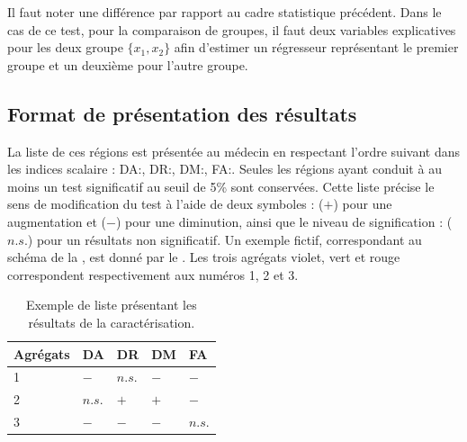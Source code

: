 Il faut noter une différence par rapport au cadre statistique précédent.
Dans le cas de ce test, pour la comparaison de groupes, il faut deux variables explicatives pour les deux groupe $\{x_1, x_2\}$ 
afin d'estimer un régresseur représentant le premier groupe et un deuxième pour l'autre groupe.


\subsection{Format de présentation des résultats}
La liste de ces régions est présentée au médecin en respectant l'ordre suivant dans les indices scalaire : DA:\da, DR:\dr, DM:\md, FA:\fa.
Seules les régions ayant conduit à au moins un test significatif au seuil de 5\% sont conservées. 
Cette liste précise le sens de modification du test à l'aide de deux symboles : ($+$) pour une augmentation et ($-$) pour une diminution, 
ainsi que le niveau de signification : ($n.s.$) pour un résultats non significatif.
Un exemple fictif, correspondant au schéma de la , est donné par le .
Les trois agrégats violet, vert et rouge correspondent respectivement aux numéros {\color{purple}1}, {\color{green}2} et {\color{red}3}.

\begin{table}[ht]
\centering
\begin{tabular}{|D{2cm}|D{1cm}|D{1cm}|D{1cm}|D{1cm}|}
      \hline
      \textbf{Agrégats} & \textbf{DA} & \textbf{DR} & \textbf{DM }& \textbf{FA} \tabularnewline
      \hline
      {\color{purple}1} & $-$ & $n.s.$ & $-$ & $-$\tabularnewline
      {\color{green}2} & $n.s.$ & $+$ & $+$ & $-$\tabularnewline
      {\color{red}3} & $-$ & $-$ & $-$ & $n.s.$\tabularnewline
      \hline
  \end{tabular}
  \caption{\label{ex_caracterisation}Exemple de liste présentant les résultats de la caractérisation.}
\end{table}

